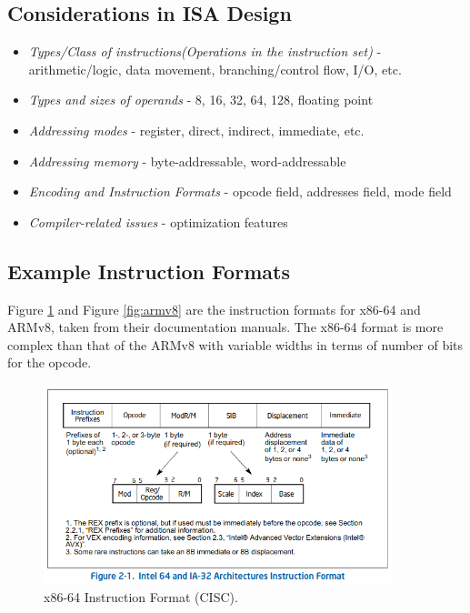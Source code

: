 \documentclass[a4paper, 11pt,oneside]{article}
\begin{document}
\subsection{Considerations in ISA Design}
\begin{itemize}
\item \textit{Types/Class of instructions(Operations in the instruction set)} - 
arithmetic/logic, data movement, branching/control flow, I/O, etc.
\item \textit{Types and sizes of operands} - 8, 16, 32, 64, 128, floating point
\item \textit{Addressing modes} - register, direct, indirect, immediate, etc.
\item \textit{Addressing memory} - byte-addressable, word-addressable
\item \textit{Encoding and Instruction Formats} - opcode field, addresses 
field, mode 
field
\item \textit{Compiler-related issues} - optimization features
\end{itemize}

\subsection{Example Instruction Formats}
Figure \ref{fig:x86-64} and Figure \ref{fig:armv8}  are the instruction formats 
for x86-64 and ARMv8, taken from their documentation manuals. The x86-64 format 
is more complex than that of the ARMv8 with variable widths in terms of number 
of bits for the opcode.

\begin{figure}[H]
	\begin{center}
	\includegraphics[width=4in]{x86-64.png}
	\caption{x86-64 Instruction Format (CISC).}
	\label{fig:x86-64} 
	\end{center}
\end{figure}
\end{document}
